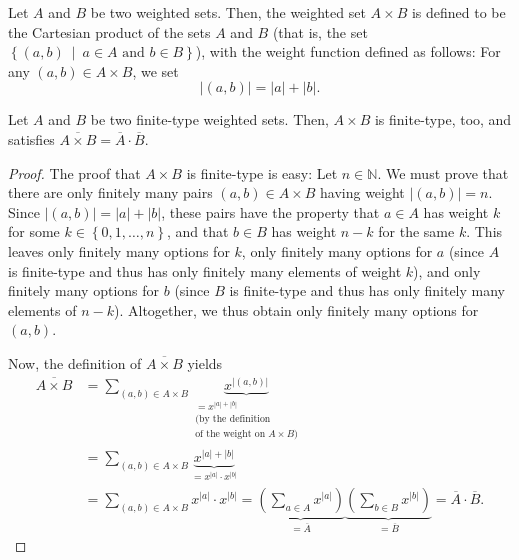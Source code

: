 \begin{definition}
\label{def.gf-ws.prod}
\leantarget
\leanok
Let $A$ and $B$ be two weighted sets. Then, the weighted
set $A\times B$ is defined to be the Cartesian product of the sets $A$ and $B$
(that is, the set $\left\{  \left(  a,b\right)  \ \mid\ a\in A\text{ and }b\in
B\right\}  $), with the weight function defined as follows: For any $\left(
a,b\right)  \in A\times B$, we set%
\begin{equation}
\left\vert \left(  a,b\right)  \right\vert =\left\vert a\right\vert
+\left\vert b\right\vert . \label{eq.def.gf-ws.prod.wt}%
\end{equation}
\end{definition}

\begin{proposition}
\label{prop.gf-ws.prod}
\leantarget
\leanok
Let $A$ and $B$ be two finite-type weighted sets. Then,
$A\times B$ is finite-type, too, and satisfies $\overline{A\times B}%
=\overline{A}\cdot\overline{B}$.
\end{proposition}

\begin{proof}
\leanok
The proof that
$A\times B$ is finite-type is easy: Let
$n\in\mathbb{N}$. We must prove that there are only finitely many pairs
$\left(  a,b\right)  \in A\times B$ having weight $\left\vert \left(
a,b\right)  \right\vert =n$. Since $\left\vert \left(  a,b\right)  \right\vert
=\left\vert a\right\vert +\left\vert b\right\vert $, these pairs have the
property that $a\in A$ has weight $k$ for some $k\in\left\{  0,1,\ldots
,n\right\}  $, and that $b\in B$ has weight $n-k$ for the same $k$. This
leaves only finitely many options for $k$, only finitely many options for $a$
(since $A$ is finite-type and thus has only finitely many elements of weight
$k$), and only finitely many options for $b$ (since $B$ is finite-type and
thus has only finitely many elements of $n-k$). Altogether, we thus obtain
only finitely many options for $\left(  a,b\right)  $.

Now, the definition of $\overline{A\times B}$ yields%
\begin{align*}
\overline{A\times B}  &  =\sum_{\left(  a,b\right)  \in A\times B}%
\underbrace{x^{\left\vert \left(  a,b\right)  \right\vert }}%
_{\substack{=x^{\left\vert a\right\vert +\left\vert b\right\vert }\\\text{(by the definition}\\
\text{of the weight on }A\times B\text{)}}}\\
&  =\sum_{\left(  a,b\right)  \in A\times B}\underbrace{x^{\left\vert
a\right\vert +\left\vert b\right\vert }}_{=x^{\left\vert a\right\vert }\cdot
x^{\left\vert b\right\vert }}\\
&  =\sum_{\left(  a,b\right)  \in A\times B}x^{\left\vert a\right\vert }\cdot
x^{\left\vert b\right\vert }=\underbrace{\left(  \sum_{a\in A}x^{\left\vert
a\right\vert }\right)  }_{=\overline{A}}\underbrace{\left(  \sum_{b\in
B}x^{\left\vert b\right\vert }\right)  }_{=\overline{B}}=\overline{A}%
\cdot\overline{B}.
\end{align*}
\end{proof}

